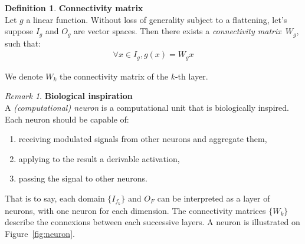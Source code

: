 \documentclass{article}
\theoremstyle{definition}
\newtheorem{definition}{Definition}[section]
\theoremstyle{remark}
\newtheorem{remark}{Remark}
\theoremstyle{plain}
\newcommand{\ovec}{}
\begin{document}
\begin{definition}\textbf{Connectivity matrix}\\
Let $g$ a linear function. Without loss of generality subject to a flattening, let's suppose $I_g$ and $O_g$ are vector spaces. Then there exists a \emph{connectivity matrix}~$W_g$, such that:
\begin{gather*}
\forall \ovec{x} \in I_g, g(\ovec{x}) = W_g\ovec{x}
\end{gather*}
\end{definition}
We denote $W_k$ the connectivity matrix of the $k$-th layer.


\begin{remark}\textbf{Biological inspiration}\\
A \emph{(computational) neuron} is a computational unit that is biologically inspired. Each neuron should be capable of:
\begin{enumerate}
\item receiving modulated signals from other neurons and aggregate them,
\item applying to the result a derivable activation,
\item passing the signal to other neurons.
\end{enumerate}
That is to say, each domain $\{I_{f_k}\}$ and $O_F$ can be interpreted as a layer of neurons, with one neuron for each dimension. The connectivity matrices $\{W_k\}$ describe the connexions between each successive layers.
A neuron is illustrated on Figure~\ref{fig:neuron}.
\end{remark}
\end{document}
